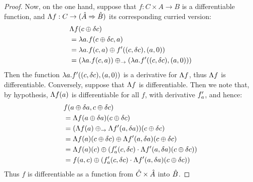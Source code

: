 \begin{proof}
  Now, on the one hand, suppose that $f : C \times A \rightarrow B$ is a differentiable function,
  and $\Lambda{f} : C \rightarrow ({\hat{A}} \Rightarrow {\hat{B}})$ its corresponding curried version:
  \begin{align*}
    &\Lambda{f}(c \oplus \delta c)\\
    &= \lambda a . f(c \oplus \delta c, a)\\
    &= \lambda a . f(c, a) \oplus f'((c, \delta c), (a, 0))\\
    &= (\lambda a . f(c, a)) \oplus_\rightarrow (\lambda a . f'((c, \delta c), (a, 0)))
  \end{align*}
  Then the function $\lambda a . f'((c, \delta c), (a, 0))$ is a derivative for $\Lambda{f}$,
  thus $\Lambda{f}$ is differentiable. Conversely, suppose that $\Lambda{f}$ is differentiable.
  Then we note that, by hypothesis, $\Lambda{f}(a)$ is differentiable for all $f$, with derivative
  $f_a'$, and hence:
  \begin{align*}
    &f(a \oplus \delta a, c \oplus \delta c)\\
    &= \Lambda{f}(a \oplus \delta a)(c \oplus \delta c)\\
    &= (\Lambda{f}(a) \oplus_\rightarrow \Lambda{f}'(a, \delta a))(c \oplus \delta c)\\
    &= \Lambda{f}(a)(c \oplus \delta c) \oplus \Lambda{f}'(a, \delta a)(c\oplus\delta c)\\
    &= \Lambda{f}(a)(c) \oplus (f_a'(c, \delta c) \cdot \Lambda{f}'(a, \delta a)(c\oplus\delta c))\\
    &= f(a, c) \oplus (f_a'(c, \delta c) \cdot \Lambda{f}'(a, \delta a)(c\oplus\delta c))
  \end{align*}
  Thus $f$ is differentiable as a function from $\hat{C} \times \hat{A}$ into $\hat{B}$.
\end{proof}

